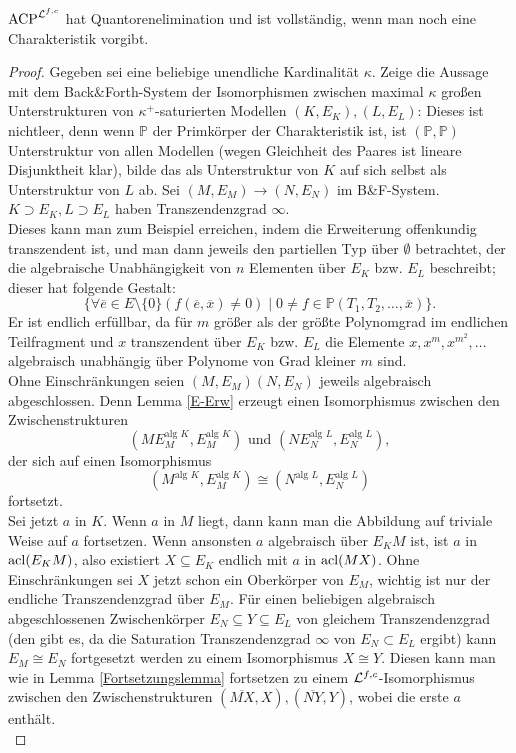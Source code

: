     \begin{theorem}\label{QE}
    	$\operatorname{ACP}^{\mathcal{L}^{f,c}}$ hat Quantorenelimination und ist vollständig, wenn man noch eine Charakteristik vorgibt.
    \end{theorem}
    \begin{proof}
    	Gegeben sei eine beliebige unendliche Kardinalität $\kappa$.
    	Zeige die Aussage mit dem Back\&Forth-System der Isomorphismen zwischen maximal $\kappa$ großen Unterstrukturen von $\kappa^+$-saturierten Modellen $(K,E_K),(L,E_L)$:
    	Dieses ist nichtleer, denn wenn $\mathbb{P}$ der Primkörper der Charakteristik ist, ist $(\mathbb{P},\mathbb{P})$ Unterstruktur von allen Modellen (wegen Gleichheit des Paares ist lineare Disjunktheit klar), bilde das als Unterstruktur von $K$ auf sich selbst als Unterstruktur von $L$ ab.
    	Sei $(M,E_M)\rightarrow(N,E_N)$ im B\&F-System. $K\supset E_K,L\supset E_L$ haben Transzendenzgrad $\infty$.\\
    	Dieses kann man zum Beispiel erreichen, indem die Erweiterung offenkundig transzendent ist, und man dann jeweils den partiellen Typ über $\emptyset$ betrachtet, der die algebraische Unabhängigkeit von $n$ Elementen über $E_K$ bzw. $E_L$ beschreibt; dieser hat folgende Gestalt:
    	$$\{\forall \overline{e}\in E\setminus\{0\}(f(\overline{e},\overline{x})\neq0)\mid 0\neq f\in\mathbb{P}(T_1,T_2,\dots,\overline{x})\}.$$
    	Er ist endlich erfüllbar, da für $m$ größer als der größte Polynomgrad im endlichen Teilfragment und $x$ transzendent über $E_K$ bzw. $E_L$ die Elemente $x,x^m,x^{m^2},\dots$ algebraisch unabhängig über Polynome von Grad kleiner $m$ sind.\\
    	Ohne Einschränkungen seien $(M,E_M)(N,E_N)$ jeweils algebraisch abgeschlossen. Denn Lemma \ref{E-Erw} erzeugt einen Isomorphismus zwischen den Zwischenstrukturen $$(ME_M^{\text{alg }K},E_M^{\text{alg }K})\text{ und }(NE_N^{\text{alg }L},E_N^{\text{alg }L}),$$ der sich auf einen Isomorphismus $$(M^{\text{alg }K},E_M^{\text{alg }K})\cong(N^{\text{alg }L},E_N^{\text{alg }L})$$ fortsetzt.\\
    	Sei jetzt $a$ in $K$. Wenn $a$ in $M$ liegt, dann kann man die Abbildung auf triviale Weise auf $a$ fortsetzen.\newpage
    	Wenn ansonsten $a$ algebraisch über $E_KM$ ist, ist $a$ in $\operatorname{acl}(E_KM)$, also existiert $X\subseteq E_K$ endlich mit $a$ in $\operatorname{acl}(MX)$. Ohne Einschränkungen sei $X$ jetzt schon ein Oberkörper von $E_M$, wichtig ist nur der endliche Transzendenzgrad über $E_M$. Für einen beliebigen algebraisch abgeschlossenen Zwischenkörper $E_N\subseteq Y\subseteq E_L$ von gleichem Transzendenzgrad (den gibt es, da die Saturation Transzendenzgrad $\infty$ von $E_N\subset E_L$ ergibt) kann $E_M\cong E_N$ fortgesetzt werden zu einem Isomorphismus $X\cong Y$. Diesen kann man wie in Lemma \ref{Fortsetzungslemma} fortsetzen zu einem $\mathcal{L}^{f,c}$-Isomorphismus zwischen den Zwischenstrukturen $(\overline{MX},X),(\overline{NY},Y)$, wobei die erste $a$ enthält.\\

\end{proof}
